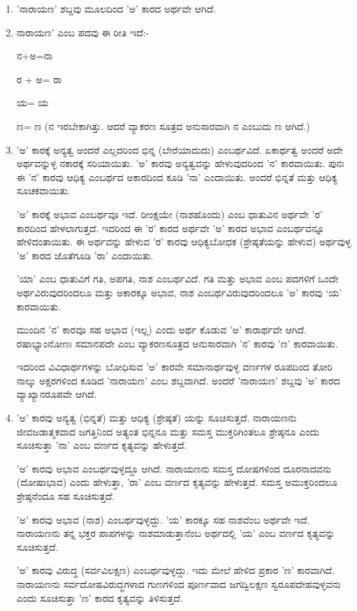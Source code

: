 \begin{enumerate}
\item 'ನಾರಾಯಣ' ಶಬ್ದವು ಮೂಲದಿಂದ 'ಅ' ಕಾರದ ಅರ್ಥವೇ ಆಗಿದೆ.

 \item 
 ನಾರಾಯಣ' ಎಂಬ ಪದವು ಈ ರೀತಿ ಇದೆ:-

 ನ+ಅ=ನಾ

 ರ + ಅ= ರಾ

 ಯ= ಯ

 ಣ= ಣ (ನ ಇರಬೇಕಾಗಿತ್ತು. ಆದರೆ ವ್ಯಾಕರಣ ಸೂತ್ರದ ಅನುಸಾರವಾಗಿ ನ ಎಂಬುದು ಣ ಆಗಿದೆ.)

 \item 
 'ಅ' ಕಾರಕ್ಕೆ ಅನ್ಯತ್ವ ಅಂದರೆ ಎಲ್ಲದರಿಂದ ಭಿನ್ನ (ಬೇರೆಯಾದುದು) ಎಂಬರ್ಥವಿದೆ. ಏಕಾರ್ಥತ್ವ ಅಂದರೆ ಅದೇ ಅರ್ಥವನ್ನುಳ್ಳ ನಕಾರಕ್ಕೆ ಸರಿಯಾಯಿತು. 'ಅ' ಕಾರವು ಅನ್ಯತ್ವವನ್ನು ಹೇಳುವುದರಿಂದ 'ನ' ಕಾರವಾಯಿತು. ಪುನಃ ಈ 'ನ' ಕಾರವು ಆಧಿಕ್ಯ ಎಂಬರ್ಥದ ಅಕಾರದಿಂದ ಕೂಡಿ 'ನಾ' ಎಂದಾಯಿತು. ಅಂದರೆ ಭಿನ್ನತೆ ಮತ್ತು ಆಧಿಕ್ಯ ಸೂಚಕವಾಯಿತು.

 'ಅ' ಕಾರಕ್ಕೆ ಅಭಾವ ಎಂಬರ್ಥವೂ ಇದೆ. ರೀಂಕ್ಷಯೇ (ನಾಶಹೊಂದು) ಎಂಬ ಧಾತುವಿನ ಅರ್ಥವೇ 'ರ' ಕಾರದಿಂದ ಹೇಳಲಾಗುತ್ತದೆ. ಇದರಿಂದ ಈ 'ರ' ಕಾರದ ಅರ್ಥವೇ 'ಅ' ಕಾರದ ಅಭಾವ ಎಂಬರ್ಥವನ್ನೂ ಹೇಳಿದಂತಾಯಿತು. ಈ ಅರ್ಥವನ್ನು ಹೇಳುವ 'ರ' ಕಾರವು ಆಧಿಕ್ಯಬೋಧಕ (ಶ್ರೇಷ್ಠತೆಯನ್ನು ಹೇಳುವ) ಅರ್ಥವುಳ್ಳ 'ಅ' ಕಾರದ ಜೊತೆಗೂಡಿ 'ರಾ' ಎಂದಾಯಿತು.

 'ಯಾ' ಎಂಬ ಧಾತುವಿಗೆ ಗತಿ, ಅಪಗತಿ, ನಾಶ ಎಂಬರ್ಥವಿದೆ. ಗತಿ ಮತ್ತು ಅಭಾವ ಎಂಬ ಪದಗಳಿಗೆ ಒಂದೇ ಅರ್ಥವಿರುವುದರಿಂದಲೂ ಮತ್ತು ಅಕಾರಕ್ಕೂ ಅಭಾವ, ನಾಶ ಎಂಬರ್ಥವಿರುವುದರಿಂದಲೂ 'ಅ' ಕಾರವು `ಯ' ಕಾರವಾಯಿತು.

 ಮುಂದಿನ 'ನ' ಕಾರವೂ ಸಹ ಅಭಾವ (ಇಲ್ಲ) ಎಂದು ಅರ್ಥ ಕೊಡುವ 'ಅ' ಕಾರಾರ್ಥವೇ ಆಗಿದೆ. ರಷಾಭ್ಯಾಂನೋಣಃ ಸಮಾನಪದೇ ಎಂಬ ವ್ಯಾಕರಣಸೂತ್ರದ ಅನುಸಾರವಾಗಿ 'ನ' ಕಾರವು 'ಣ' ಕಾರವಾಯಿತು.

 ಇದರಿಂದ ವಿವಿಧಾರ್ಥಗಳನ್ನು ಬೋಧಿಸುವ 'ಅ' ಕಾರವೇ ಸಮಾನಾರ್ಥವುಳ್ಳ ವರ್ಣಗಳ ರೂಪದಿಂದ ತೋರಿ ನಾಲ್ಕು ಅಕ್ಷರಗಳಿಂದ ಕೂಡಿದ 'ನಾರಾಯಣ' ಎಂಬ ಶಬ್ದವಾಗಿದೆ. ಅಂದರೆ 'ನಾರಾಯಣ' ಶಬ್ದವು 'ಅ' ಕಾರದ ವ್ಯಾಖ್ಯಾನರೂಪವೇ ಆಗಿದೆ.

 \item 
 'ಅ' ಕಾರವು ಅನ್ಯತ್ವ (ಭಿನ್ನತೆ) ಮತ್ತು ಆಧಿಕ್ಯ (ಶ್ರೇಷ್ಠತೆ) ಯನ್ನು ಸೂಚಿಸುತ್ತದೆ. ನಾರಾಯಣನು ಜೀವಜಡಾತ್ಮಕವಾದ ಜಗತ್ತಿನಿಂದ ಅತ್ಯಂತ ಭಿನ್ನನೂ ಮತ್ತು ಸಮಸ್ತ ಮುಕ್ತರಿಗಿಂತಲೂ ಶ್ರೇಷ್ಠನೂ ಎಂದು ಸೂಚಿಸುತ್ತಾ 'ನಾ' ಎಂಬ ವರ್ಣದ ಕೃತ್ಯವನ್ನು ಹೇಳುತ್ತದೆ.

 'ಅ' ಕಾರವು ಅಭಾವ ಎಂಬರ್ಥವುಳ್ಳದ್ದೂ ಆಗಿದೆ. ನಾರಾಯಣನು ಸಮಸ್ತ ದೋಷಗಳಿಂದ ದೂರನಾದವನು (ದೋಷಾಭಾವ) ಎಂದು ಹೇಳುತ್ತಾ, 'ರಾ' ಎಂಬ ವರ್ಣದ ಕೃತ್ಯವನ್ನು ಹೇಳುತ್ತದೆ. ಸಮಸ್ತ ಅಮುಕ್ತರಿಂದಲೂ ಶ್ರೇಷ್ಠನೆಂದೂ ಸಹ ಸೂಚಿಸುತ್ತದೆ. 

 'ಅ' ಕಾರವು ಅಭಾವ (ನಾಶ) ಎಂಬರ್ಥವುಳ್ಳದ್ದು. 'ಯ' ಕಾರಕ್ಕೂ ಸಹ ನಾಶವೆಂಬ ಅರ್ಥವೇ ಇದೆ. ನಾರಾಯಣನು ತನ್ನ ಭಕ್ತರ ಪಾಪಗಳನ್ನು ನಾಶಮಾಡುತ್ತಾನೆಂಬ ಅರ್ಥದಲ್ಲಿ 'ಯ' ಎಂಬ ವರ್ಣದ ಕೃತ್ಯವನ್ನು ಸೂಚಿಸುತ್ತದೆ. 

 'ಅ' ಕಾರವು ವಿರುದ್ಧ (ಸರ್ವವಿಲಕ್ಷಣ) ಎಂಬರ್ಥವುಳ್ಳದ್ದು. ಇದು ಮೇಲೆ ಹೇಳಿದ ಪ್ರಕಾರ 'ಣ' ಕಾರವಾಗಿದೆ. ನಾರಾಯಣನು ಸರ್ವದೋಷವಿರುದ್ಧಗಳಾದ ಗುಣಗಳಿಂದ ಪೂರ್ಣವಾದ ಜಗದ್ವಿಲಕ್ಷಣ ಸ್ವರೂಪದೇಹವುಳ್ಳವನು ಎಂದು ಸೂಚಿಸುತ್ತಾ 'ಣ' ಕಾರದ ಕೃತ್ಯವನ್ನು ತಿಳಿಸುತ್ತದೆ.

\end{enumerate}

